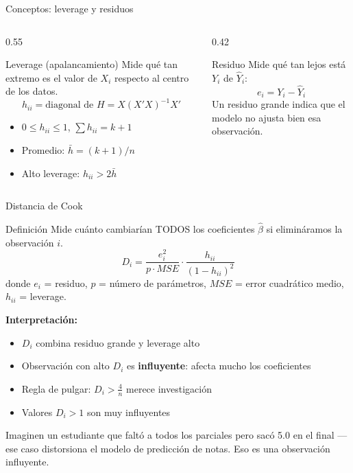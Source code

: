 \documentclass[aspectratio=169, 11pt]{beamer}
\begin{document}
\begin{frame}{Conceptos: leverage y residuos}
\begin{columns}
\begin{column}{0.55\textwidth}
\begin{block}{Leverage (apalancamiento)}
Mide qué tan extremo es el valor de $X_i$ respecto al centro de los datos.
$$h_{ii} = \text{diagonal de } H = X(X'X)^{-1}X'$$
\begin{itemize}
\item $0 \leq h_{ii} \leq 1$, \; $\sum h_{ii} = k+1$
\item Promedio: $\bar{h} = (k+1)/n$
\item Alto leverage: $h_{ii} > 2\bar{h}$
\end{itemize}
\end{block}
\end{column}

\begin{column}{0.42\textwidth}
\begin{block}{Residuo}
Mide qué tan lejos está $Y_i$ de $\hat{Y}_i$:
$$e_i = Y_i - \hat{Y}_i$$
Un residuo grande indica que el modelo no ajusta bien esa observación.
\end{block}
\end{column}
\end{columns}
\end{frame}

\begin{frame}{Distancia de Cook}
\begin{block}{Definición}
Mide cuánto cambiarían TODOS los coeficientes $\hat{\beta}$ si elimináramos la observación $i$.
$$D_i = \frac{e_i^2}{p \cdot MSE} \cdot \frac{h_{ii}}{(1-h_{ii})^2}$$
donde $e_i$ = residuo, $p$ = número de parámetros, $MSE$ = error cuadrático medio, $h_{ii}$ = leverage.
\end{block}

\vspace{0.15cm}
\textbf{Interpretaci\'on:}
\begin{itemize}
\item $D_i$ combina residuo grande y leverage alto
\item Observaci\'on con alto $D_i$ es \textbf{influyente}: afecta mucho los coeficientes
\item Regla de pulgar: $D_i > \frac{4}{n}$ merece investigaci\'on
\item Valores $D_i > 1$ son muy influyentes
\end{itemize}

\smallskip
\small Imaginen un estudiante que falt\'o a todos los parciales pero sac\'o 5.0 en el final --- ese caso distorsiona el modelo de predicci\'on de notas. Eso es una observaci\'on influyente.
\end{frame}
\end{document}
